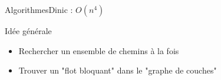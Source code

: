 \begin{frame}{Algorithmes}{Dinic : $O(n^4)$}
\begin{block}{Idée générale}
\begin{itemize}
\item Rechercher un ensemble de chemins à la fois
\item Trouver un "flot bloquant" dans le "graphe de couches"
\end{itemize}
\end{block}
\end{frame}
